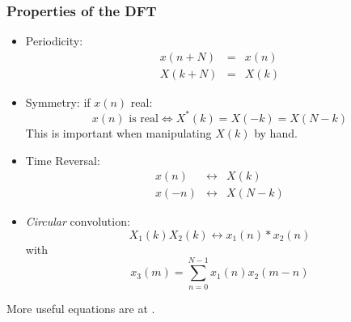 \documentclass[12pt,a4paper]{article}
\begin{document}
\subsubsection{Properties of the DFT}
\begin{itemize}
\item Periodicity:
\begin{eqnarray}
x(n + N) & = & x(n) \\
X(k + N) & = & X(k)
\end{eqnarray}

\item Symmetry: if $x(n)$ real:
\begin{equation}
x(n)\mbox{ is real} \Leftrightarrow X^*(k) = X(-k) = X(N-k)
\end{equation}
This is important when manipulating $X(k)$ by hand.

\item Time Reversal:
\begin{eqnarray}
x(n) & \leftrightarrow & X(k) \\
x(-n)& \leftrightarrow & X(N - k)
\end{eqnarray}

\item \textsl{Circular} convolution:
\begin{equation}
X_{1}(k) X_{2}(k) \leftrightarrow x_1(n) * x_2(n)
\end{equation}
with
\begin{equation} 
x_{3}(m) = \sum_{n = 0}^{N - 1} x_{1}(n) x_{2}(m - n)
\end{equation}
\end{itemize}
More useful equations are at \citet[pp.415]{Proakis1996}.
\end{document}

